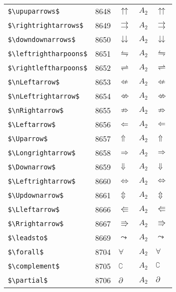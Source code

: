 \documentclass{article}
\begin{document}
\begin{table}
\begin{center}
\begin{tabular}{llll}
 \verb#$\upuparrows$#          & 8648    & $\upuparrows$          & $A_2\quad \upuparrows$\\
 \verb#$\rightrightarrows$#    & 8649    & $\rightrightarrows$    & $A_2\quad \rightrightarrows$\\
 \verb#$\downdownarrows$#      & 8650    & $\downdownarrows$      & $A_2\quad \downdownarrows$\\
 \verb#$\leftrightharpoons$#   & 8651    & $\leftrightharpoons$   & $A_2\quad \leftrightharpoons$\\
 \verb#$\rightleftharpoons$#   & 8652    & $\rightleftharpoons$   & $A_2\quad \rightleftharpoons$\\
 \verb#$\nLeftarrow$#          & 8653    & $\nLeftarrow$          & $A_2\quad \nLeftarrow$\\
 \verb#$\nLeftrightarrow$#     & 8654    & $\nLeftrightarrow$     & $A_2\quad \nLeftrightarrow$\\
 \verb#$\nRightarrow$#         & 8655    & $\nRightarrow$         & $A_2\quad \nRightarrow$\\
 \verb#$\Leftarrow$#           & 8656    & $\Leftarrow$           & $A_2\quad \Leftarrow$\\
 \verb#$\Uparrow$#             & 8657    & $\Uparrow$             & $A_2\quad \Uparrow$\\
 \verb#$\Longrightarrow$#      & 8658    & $\Longrightarrow$      & $A_2\quad \Longrightarrow$\\
 \verb#$\Downarrow$#           & 8659    & $\Downarrow$           & $A_2\quad \Downarrow$\\
 \verb#$\Leftrightarrow$#      & 8660    & $\Leftrightarrow$      & $A_2\quad \Leftrightarrow$\\
 \verb#$\Updownarrow$#         & 8661    & $\Updownarrow$         & $A_2\quad \Updownarrow$\\
 \verb#$\Lleftarrow$#          & 8666    & $\Lleftarrow$          & $A_2\quad \Lleftarrow$\\
 \verb#$\Rrightarrow$#         & 8667    & $\Rrightarrow$         & $A_2\quad \Rrightarrow$\\
 \verb#$\leadsto$#             & 8669    & $\leadsto$             & $A_2\quad \leadsto$\\
 \verb#$\forall$#              & 8704    & $\forall$              & $A_2\quad \forall$\\
 \verb#$\complement$#          & 8705    & $\complement$          & $A_2\quad \complement$\\
 \verb#$\partial$#             & 8706    & $\partial$             & $A_2\quad \partial$\\

\end{tabular}
\end{center}
\end{table}
\end{document}
